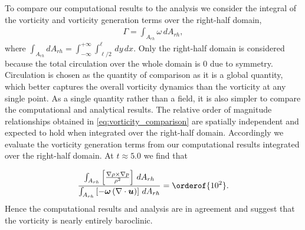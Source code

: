 To compare our computational results to the analysis we consider the
integral of the vorticity and vorticity generation terms over the
right-half domain,
\begin{align}
  \Gamma = \int_{A_{rh}} \omega \,dA_{rh},
\end{align}
where $\int_{A_{rh}} dA_{rh} =
\int_{-\infty}^{+\infty}\int_{\ell/2}^{\ell} \,dy\, dx$. Only the
right-half domain is considered because the total circulation over the
whole domain is $0$ due to symmetry. Circulation is chosen as the
quantity of comparison as it is a global quantity, which better
captures the overall vorticity dynamics than the vorticity at any
single point. As a single quantity rather than a field, it is also
simpler to compare the computational and analytical results. The
relative order of magnitude relationships obtained in
\eqref{eq:vorticity_comparison} are spatially independent and expected
to hold when integrated over the right-half domain. Accordingly we
evaluate the vorticity generation terms from our computational results
integrated over the right-half domain. At $t\approx5.0$ we find that %
\begin{comment}
  $$ \int_{A_{rh}} \left[\frac{\nabla\rho\times\nabla p}{\rho^2}\right]\,dA_{rh} / \int_{A_{rh}}\left[\left(\boldsymbol{u}\cdot\nabla\right)\boldsymbol{\omega}\right]\,dA_{rh}\approx 285=\orderof{10^2}$$
  and
\end{comment}
\begin{align}
  \frac{\int_{A_{rh}} \left[\frac{\nabla\rho\times\nabla p}{\rho^2}\right]\,dA_{rh}}%
  {\int_{A_{rh}} \left[-\boldsymbol{\omega}\left(\nabla\cdot\boldsymbol{u}\right)\right]%
  \,dA_{rh}}%
  =\orderof{10^2}.
\end{align}
% 
Hence the computational results and analysis are in agreement and
suggest that the vorticity is nearly entirely baroclinic.
% 

